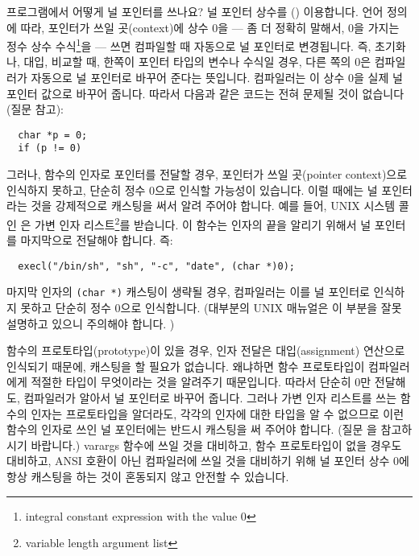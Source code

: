 \begin{faq}
	프로그램에서 어떻게 널 포인터를 쓰나요?
\A
	널 포인터 상수를 () 이용합니다.
	언어 정의에 따라, 포인터가 쓰일 곳(context)에 상수 0을 ---
	좀 더 정확히 말해서, 0을 가지는 정수 상수 수식\footnote{integral
	constant expression with the value 0}을 --- 쓰면
	컴파일할 때 자동으로 널 포인터로 변경됩니다.
	즉, 초기화나, 대입, 비교할 때, 한쪽이 포인터 타입의 변수나
	수식일 경우, 다른 쪽의 0은 컴파일러가 자동으로 널 포인터로
	바꾸어 준다는 뜻입니다.  컴파일러는 이 상수 0을 실제 널 포인터
	값으로 바꾸어 줍니다.  따라서 다음과 같은 코드는 전혀 문제될 것이
	없습니다 (질문  참고):

\begin{verbatim}
  char *p = 0;
  if (p != 0)
\end{verbatim}
	\noindent {}

	그러나, 함수의 인자로 포인터를 전달할 경우, 
	포인터가 쓰일 곳(pointer context)으로 인식하지 못하고, 
	단순히 정수 0으로 인식할 가능성이 있습니다.
	이럴 때에는 널 포인터라는 것을 강제적으로 캐스팅을 써서 알려
	주어야 합니다.  예를 들어, UNIX 시스템 콜인 은 가변 인자
	리스트\footnote{variable length argument list}를 받습니다.
	이 함수는 인자의 끝을 알리기 위해서 널 포인터를 마지막으로
	전달해야 합니다.  즉:

\begin{verbatim}
  execl("/bin/sh", "sh", "-c", "date", (char *)0);
\end{verbatim}

	\noindent 마지막 인자의 \verb+(char *)+ 캐스팅이 생략될 경우,
	컴파일러는 이를 널 포인터로 인식하지 못하고 단순히 정수 0으로
	인식합니다.  (대부분의 UNIX 매뉴얼은 이 부분을 잘못 설명하고
	있으니 주의해야 합니다. )

	함수의 프로토타입(prototype)이 있을 경우, 인자 전달은 대입(assignment)
	연산으로
	인식되기 때문에, 캐스팅을 할 필요가 없습니다.  왜냐하면
	함수 프로토타입이 컴파일러에게 적절한 타입이 무엇이라는 것을 알려주기
	때문입니다.  따라서 단순히 0만 전달해도, 컴파일러가 알아서 널
	포인터로 바꾸어 줍니다.  그러나 가변 인자 리스트를 쓰는 함수의 인자는
	프로토타입을 알더라도, 각각의
	인자에 대한 타입을 알 수 없으므로 이런 함수의 인자로 쓰인 널 포인터에는
	반드시 캐스팅을 써 주어야 합니다.
        (질문 을 참고하시기 바랍니다.)
	varargs 함수에 쓰일 것을 대비하고, 함수 프로토타입이 없을 경우도
	대비하고, ANSI 호환이 아닌 컴파일러에 쓰일 것을 대비하기 위해
	널 포인터 상수 0에 항상 캐스팅을 하는 것이 혼동되지 않고 안전할
	수 있습니다.


\end{faq}
